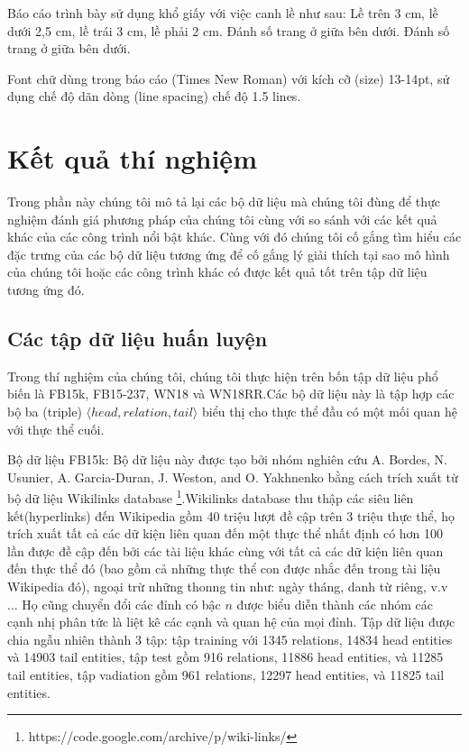 
 Báo cáo trình bày sử dụng khổ giấy với việc canh lề như sau: Lề trên 3 cm, lề dưới 2,5 cm, lề trái 3 cm, lề phải 2 cm. Đánh số trang ở giữa bên dưới. Đánh số trang ở giữa bên dưới.

Font chữ dùng trong báo cáo (Times New Roman) với kích cỡ (size) 13-14pt, sử dụng chế độ dãn dòng (line spacing) chế độ 1.5 lines.


\section{Kết quả thí nghiệm}
Trong phần này chúng tôi mô tả lại các bộ dữ liệu mà chúng tôi đùng để thực nghiệm đánh giá phương pháp của chúng tôi cùng với so sánh với các kết quả khác của các công trình nổi bật khác. Cùng với đó chúng tôi cố gắng tìm hiểu các đặc trưng của các bộ dữ liệu tương ứng để cố gắng lý giải thích tại sao mô hình của chúng tôi hoặc các công trình khác có được kết quả tốt trên tập dữ liệu tương ứng đó.
\subsection{Các tập dữ liệu huấn luyện}
Trong thí nghiệm của chúng tôi, chúng tôi thực hiện trên bốn tập dữ liệu phổ biến là FB15k, FB15-237, WN18 và WN18RR.Các bộ dữ liệu này là tập hợp các bộ ba (triple) \(\langle head, relation, tail \rangle\) biểu thị cho thực thể đầu có một mối quan hệ với thực thể cuối.

Bộ dữ liệu FB15k: Bộ dữ liệu này được tạo bởi nhóm nghiên cứu A. Bordes, N. Usunier, A. Garcia-Duran, J. Weston, and O. Yakhnenko \cite{bordes2013translating} bằng cách trích xuất từ bộ dữ liệu Wikilinks database \footnote{https://code.google.com/archive/p/wiki-links/}.Wikilinks database thu thập các siêu liên kết(hyperlinks) đến Wikipedia gồm 40 triệu lượt đề cập trên 3 triệu thực thể, họ trích xuất tất cả các dữ kiện liên quan đến một thực thể nhất định có hơn 100 lần được đề cập đến bởi các tài liệu khác cùng với tất cả các dữ kiện liên quan đến thực thể đó (bao gồm cả những thực thể con được nhắc đến trong tài liệu Wikipedia đó), ngoại trừ những thonng tin như: ngày tháng, danh từ riêng, v.v ... Họ cũng chuyển đổi các đỉnh có bậc \(n\) được biểu diễn thành các nhóm các cạnh nhị phân tức là liệt kê các cạnh và quan hệ của mọi đỉnh. Tập dữ liệu được chia ngẫu nhiên thành 3 tập: tập training với 1345 relations, 14834 head entities và 14903 tail entities, tập test gồm 916 relations, 11886 head entities, và 11285 tail entities, tập vadiation gồm 961 relations, 12297 head entities, và 11825 tail entities.

